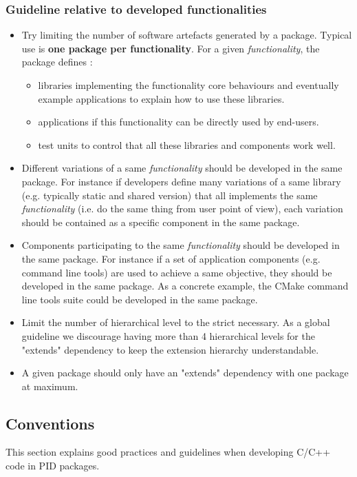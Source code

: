 \documentclass[12pt,a4paper]{article}
\begin{document}
\subsubsection{Guideline relative to developed functionalities}
\begin{itemize}
\item Try limiting the number of software artefacts generated by a package. Typical use is \textbf{one package per functionality}. For a given \textit{functionality}, the package defines :
\begin{itemize}
\item libraries implementing the functionality core behaviours and eventually example applications to explain how to use these libraries.
\item applications if this functionality can be directly used by end-users.
\item test units to control that all these libraries and components work well.
\end{itemize}
\item Different variations of a same \textit{functionality} should be developed in the same package. For instance if developers define many variations of a same library (e.g. typically static and shared version) that all implements the same \textit{functionality} (i.e. do the same thing from user point of view), each variation should be contained as a specific component in the same package. 
\item Components participating to the same \textit{functionality} should be developed in the same package. For instance if a set of application components (e.g. command line tools) are used to achieve a same objective, they should be developed in the same package. As a concrete example, the CMake command line tools suite could be developed in the same package.
\item Limit the number of hierarchical level to the strict necessary. As a global guideline we discourage having more than 4 hierarchical levels for the "extends" dependency to keep the extension hierarchy understandable.
\item A given package should only have an "extends" dependency with one package at maximum.
\end{itemize}

\subsection{Conventions}

This section explains good practices and guidelines when developing C/C++ code in PID packages.
\end{document}
